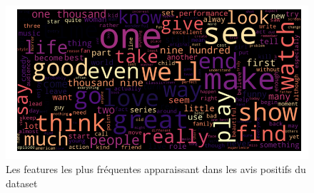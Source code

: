 \documentclass[12pt,a4paper]{report}
\theoremstyle{definition}
\begin{document}
\begin{appendices}
\begin{figure}[!ht]
  \centering
  \includegraphics[scale=0.5]{images/wordcloud/positive_wordcloud.png}
  \caption{Les features les plus fréquentes apparaissant dans les avis positifs du dataset}
  \label{fig:positive_wordcloud}
\end{figure}

\end{appendices}
\end{document}
